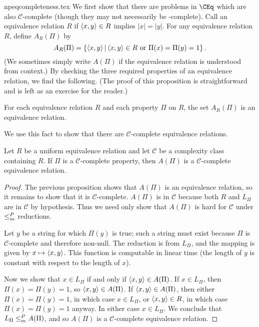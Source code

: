 \begin{filecontents}{npeqcompleteness.tex}
We first show that there are problems in $\CEq$ which are also $\mathcal{C}$-complete (though they may not necessarily be \CEq-complete).
Call an equivalence relation $R$  if $\pair{x}{y} \in R$ implies $|x| = |y|$.
For any equivalence relation $R$, define $A_R(\Pi)$ by
\begin{displaymath}
  A_R(\Pi) = \lb \pair{x}{y}\st \pair{x}{y} \in R \plain{or} \Pi(x) = \Pi(y) = 1\rb.
\end{displaymath}
(We sometimes simply write $A(\Pi)$ if the equivalence relation is understood from context.)
By checking the three required properties of an equivalence relation, we find the following.
(The proof of this proposition is straightforward and is left as an exercise for the reader.)
\begin{proposition}
  For each equivalence relation $R$ and each property $\Pi$ on $R$, the set $A_R(\Pi)$ is an equivalence relation.
\end{proposition}
We use this fact to show that there are $\mathcal{C}$-complete equivalence relations.
\begin{proposition}\label{prop:APi}
  Let $R$ be a uniform equivalence relation and let $\mathcal{C}$ be a complexity class containing $R$.
  If $\Pi$ is a $\mathcal{C}$-complete property, then $A(\Pi)$ is a $\mathcal{C}$-complete equivalence relation.
\end{proposition}
\begin{proof}
  The previous proposition shows that $A(\Pi)$ is an equivalence relation, so it remains to show that it is $\mathcal{C}$-complete.
  $A(\Pi)$ is in $\mathcal{C}$ because both $R$ and $L_\Pi$ are in $\mathcal{C}$ by hypothesis.
  Thus we need only show that $A(\Pi)$ is hard for $\mathcal{C}$ under $\mor$ reductions.

  Let $y$ be a string for which $\Pi(y)$ is true; such a string must exist because $\Pi$ is $\mathcal{C}$-complete and therefore non-null.
  The reduction is from $L_\Pi$, and the mapping is given by $x \mapsto \pair{x}{y}$.
  This function is computable in linear time (the length of $y$ is constant with respect to the length of $x$).

  Now we show that $x \in L_\Pi$ if and only if $\pair{x}{y} \in A(\Pi)$.
  If $x \in L_\Pi$, then $\Pi(x) = \Pi(y) = 1$, so $\pair{x}{y} \in A(\Pi)$.
  If $\pair{x}{y} \in A(\Pi)$, then either $\Pi(x) = \Pi(y) = 1$, in which case $x \in L_\Pi$, or $\pair{x}{y} \in R$, in which case $\Pi(x) = \Pi(y) = 1$ anyway.
  In either case $x \in L_\Pi$.
  We conclude that $L_\Pi \mor A(\Pi)$, and so $A(\Pi)$ is a $\mathcal{C}$-complete equivalence relation.
\end{proof}


\end{filecontents}
